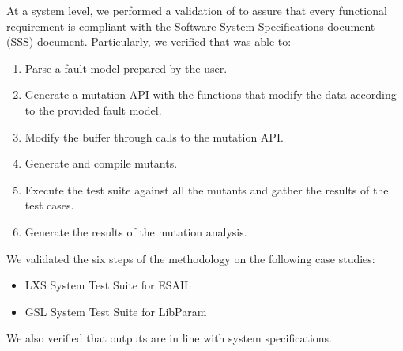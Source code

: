 At a system level, we performed a validation of \DAMA to assure that every functional requirement is compliant with the Software System Specifications document (SSS) document.
Particularly, we verified that \DAMA was able to:
\begin{enumerate}
	\item Parse a fault model prepared by the user.
	\item Generate a mutation API with the functions that modify the data according to the provided fault model.
  \item Modify the buffer through calls to the mutation API.
	\item Generate and compile mutants.
	\item Execute the test suite against all the mutants and gather the results of the test cases.
	\item Generate the results of the mutation analysis.
\end{enumerate}

We validated the six steps of the methodology on the following case studies:
\begin{itemize}
  \item LXS System Test Suite for ESAIL
  \item GSL System Test Suite for LibParam
\end{itemize}

We also verified that outputs are in line with system specifications.


\clearpage


